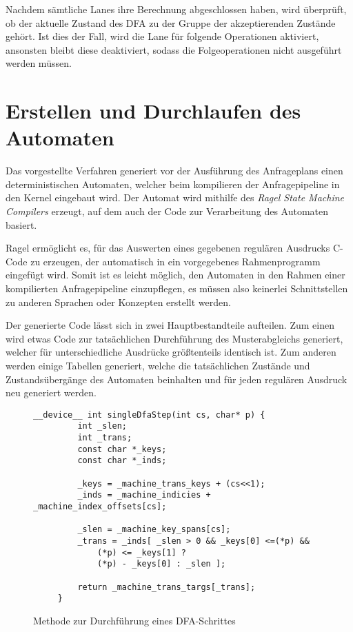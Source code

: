 Nachdem sämtliche Lanes ihre Berechnung abgeschlossen haben, wird überprüft, ob der aktuelle Zustand des DFA zu der Gruppe der akzeptierenden Zustände gehört.
Ist dies der Fall, wird die Lane für folgende Operationen aktiviert, ansonsten bleibt diese deaktiviert, sodass die Folgeoperationen nicht ausgeführt werden müssen.

\section{Erstellen und Durchlaufen des Automaten}
\label{sec:regex_duchlaufen}

Das vorgestellte Verfahren generiert vor der Ausführung des Anfrageplans einen deterministischen Automaten, welcher beim kompilieren der Anfragepipeline in den Kernel eingebaut wird.
Der Automat wird mithilfe des \emph{Ragel State Machine Compilers} \cite{Thurston2009} erzeugt, auf dem auch der Code zur Verarbeitung des Automaten basiert.

Ragel ermöglicht es, für das Auswerten eines gegebenen regulären Ausdrucks C-Code zu erzeugen, der automatisch in ein vorgegebenes Rahmenprogramm eingefügt wird.
Somit ist es leicht möglich, den Automaten in den Rahmen einer kompilierten Anfragepipeline einzupflegen, es müssen also keinerlei Schnittstellen zu anderen Sprachen oder Konzepten erstellt werden.

Der generierte Code lässt sich in zwei Hauptbestandteile aufteilen.
Zum einen wird etwas Code zur tatsächlichen Durchführung des Musterabgleichs generiert, welcher für unterschiedliche Ausdrücke größtenteils identisch ist.
Zum anderen werden einige Tabellen generiert, welche die tatsächlichen Zustände und Zustandsübergänge des Automaten beinhalten und für jeden regulären Ausdruck neu generiert werden.

\begin{figure}[]
	 \begin{lstlisting}[language=MyC++]
	 __device__ int singleDfaStep(int cs, char* p) {
		 int _slen;
		 int _trans;
		 const char *_keys;
		 const char *_inds;
		 
		 _keys = _machine_trans_keys + (cs<<1);
		 _inds = _machine_indicies + _machine_index_offsets[cs];
		 
		 _slen = _machine_key_spans[cs];
		 _trans = _inds[ _slen > 0 && _keys[0] <=(*p) &&
			 (*p) <= _keys[1] ?
			 (*p) - _keys[0] : _slen ];
		 
		 return _machine_trans_targs[_trans];
	 }
	 \end{lstlisting}
	 \caption{Methode zur Durchführung eines DFA-Schrittes}
	 \label{naive_regex_singledfastep}
\end{figure}
 
